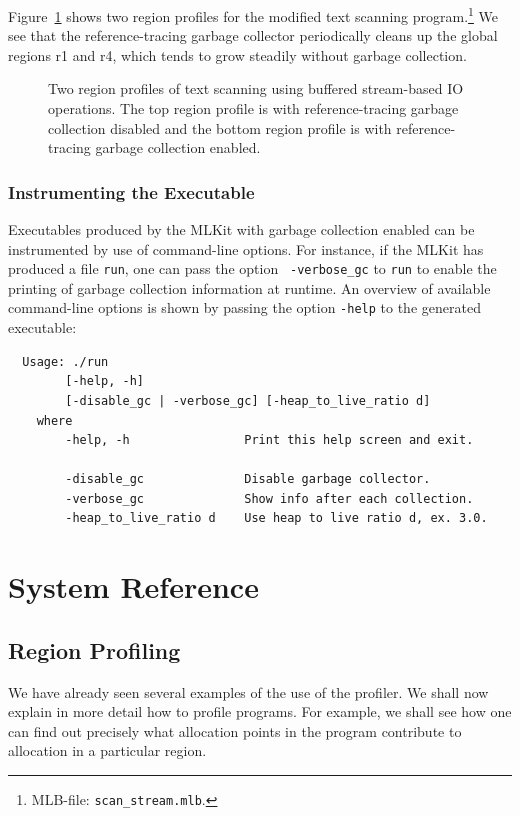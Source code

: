\documentclass[12pt]{book}
\begin{document}
Figure~\ref{scan-stream.fig} shows two region profiles for the
modified text scanning program.\footnote{MLB-file:
  \texttt{scan\_stream.mlb}.} We see that the reference-tracing
garbage collector periodically cleans up the global regions r1 and r4,
which tends to grow steadily without garbage collection.

\begin{figure}


\caption{Two region profiles of text scanning using buffered
  stream-based IO operations. The top region profile is with
  reference-tracing garbage collection disabled and the bottom
  region profile is with reference-tracing garbage collection
  enabled.}
\label{scan-stream.fig}
\end{figure}


\section{Instrumenting the Executable}
Executables produced by the MLKit with garbage collection enabled can be
instrumented by use of command-line options. For instance, if the MLKit
has produced a file {\tt run}, one can pass the option {\tt
  -verbose\_gc} to {\tt run} to enable the printing of garbage
collection information at runtime. An overview of available
command-line options is shown by passing the option {\tt -help} to the
generated executable: {\small
\begin{verbatim}
  Usage: ./run
        [-help, -h]
        [-disable_gc | -verbose_gc] [-heap_to_live_ratio d]
    where
        -help, -h                Print this help screen and exit.

        -disable_gc              Disable garbage collector.
        -verbose_gc              Show info after each collection.
        -heap_to_live_ratio d    Use heap to live ratio d, ex. 3.0.
\end{verbatim}
}

\part{System Reference}

\chapter{Region Profiling}
\label{useOfProf.sec}
We have already seen several examples of the use of the profiler. We
shall now explain in more detail how to profile programs. For example, we shall see
how one can find out precisely what allocation points in the program
contribute to allocation in a particular region.
\end{document}
